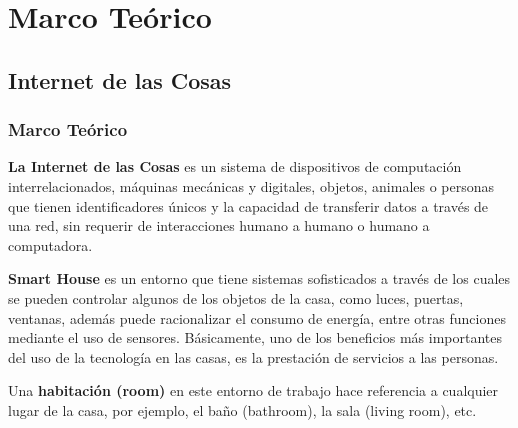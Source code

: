 \section{Marco Teórico}

\begin{frame}[t]
\subsection{Internet de las Cosas}
\frametitle{Marco Teórico}

\small
\textbf{La Internet de las Cosas} es un sistema de dispositivos de computación interrelacionados, máquinas mecánicas y digitales, objetos, animales o personas que tienen identificadores únicos y la capacidad de transferir datos a través de una red, sin requerir de interacciones humano a humano o humano a computadora. \newline

\textbf{Smart House} es un entorno que tiene sistemas sofisticados a través de los cuales se pueden controlar algunos de los objetos de la casa, como luces, puertas, ventanas, además puede racionalizar el consumo de energía, entre otras funciones mediante el uso de sensores. Básicamente, uno de los beneficios más importantes del uso de la tecnología en las casas, es la prestación de servicios a las personas.\cite{Howedi2016}\newline

Una \textbf{habitación (room)} en este entorno de trabajo hace referencia a cualquier lugar de la casa, por ejemplo, el baño (bathroom), la sala (living room), etc.
\end{frame}